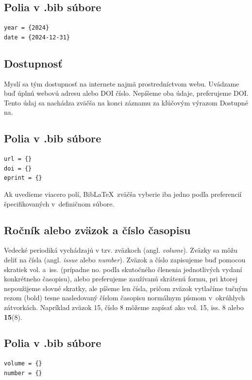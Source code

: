 \subsection*{\normalsize Polia v .bib súbore}
\begin{verbatim}
year = {2024}
date = {2024-12-31}
\end{verbatim}

\subsection*{Dostupnosť}
Myslí sa tým dostupnosť na internete najmä prostredníctvom webu.
Uvádzame buď úplnú webovú adresu alebo DOI číslo.
Nepíšeme oba údaje, preferujeme DOI.
Tento údaj sa nachádza zväčša na konci záznamu za kľúčovým výrazom Dostupné na.

\subsection*{\normalsize Polia v .bib súbore}
\begin{verbatim}
url = {}
doi = {}
eprint = {}
\end{verbatim}
Ak uvedieme viacero polí, Bib\LaTeX\ zväčša vyberie iba jedno
podľa preferencií špecifikovaných v~definičnom súbore.

\subsection*{Ročník alebo zväzok a číslo časopisu}
Vedecké periodiká vychádzajú v tzv. zväzkoch (angl. \foreignlanguage{english}{\it volume}).
Zväzky sa môžu deliť na čísla
(angl. \foreignlanguage{english}{\it issue} alebo
\foreignlanguage{english}{\it number}).
Zväzok a číslo zapisujeme buď pomocou skratiek vol. a~iss.
(prípadne no. podľa skutočného členenia jednotlivých vydaní konkrétneho časopisu),
alebo preferujeme zaužívanú skrátenú formu,
pri ktorej nepoužijeme slovné skratky,
ale píšeme len čísla,
pričom zväzok vytlačíme tučným rezom (bold)
tesne nasledovaný číslom časopisu normálnym písmom
v~okrúhlych zátvorkách.
Napríklad zväzok 15, číslo 8 môžeme zapísať
ako vol. 15, iss. 8 alebo \textbf{15}(8).

\subsection*{\normalsize Polia v .bib súbore}
\begin{verbatim}
volume = {}
number = {}
\end{verbatim}

